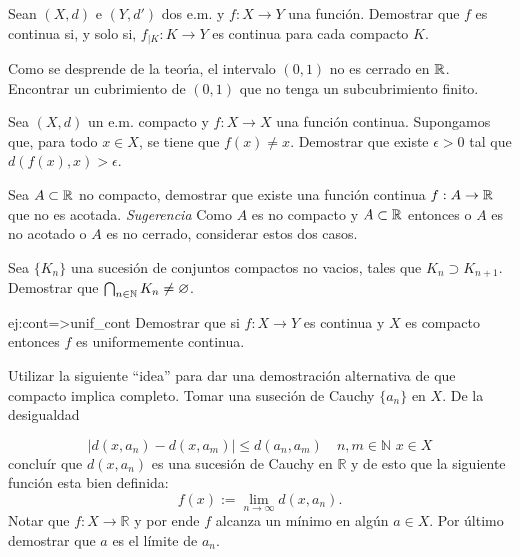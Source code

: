\begin{ejercicio}{} Sean $(X,d)$ e $(Y,d')$ dos e.m. y $f:X\to Y$
una funci\'on. Demostrar que $f$ es continua si, y solo si,
$f_{|K}:K\to Y$ es continua para cada compacto $K$.
\end{ejercicio}


\begin{ejercicio}{} Como se desprende de la teor\'{\i}a, el intervalo
$(0,1)$ no es cerrado en $\mathbb{R}$. Encontrar un cubrimiento de
$(0,1)$ que no tenga un subcubrimiento finito.
\end{ejercicio}

\begin{ejercicio}{} Sea $(X,d)$ un e.m. compacto y $f:X\to X$ una
funci\'on continua. Supongamos que, para todo $x\in X$, se tiene
que $f(x)\neq x$. Demostrar que existe $\epsilon>0$ tal que
$d(f(x),x)>\epsilon$.
\end{ejercicio}

\begin{ejercicio}{} Sea $A\subset\mathbb{R}$ no compacto, demostrar que
existe una funci\'on continua $f:A\to\mathbb{R}$ que no es acotada.
\emph{Sugerencia} Como $A$ es no compacto y $A\subset \mathbb{R}$
entonces o $A$ es no acotado o $A$ es no cerrado, considerar estos
dos casos.
\end{ejercicio}


\begin{ejercicio}{} Sea $\{K_n\}$ una sucesi\'on de conjuntos
compactos no vacios, tales que $K_n\supset K_{n+1}$. Demostrar que
$\bigcap_{n\in\mathbb{N}}K_n\neq\varnothing$.
\end{ejercicio}

\begin{ejercicio}{ej:cont=>unif_cont} Demostrar que si $f:X\to Y$ es continua y $X$ es compacto entonces $f$ es uniformemente continua.
\end{ejercicio}

 
 \begin{ejercicio}{} Utilizar la siguiente ``idea'' para dar una
 demostración alternativa de que compacto implica completo. Tomar
 una suseción de Cauchy $\{a_n\}$ en $X$. De la desigualdad

 \[
	|d(x,a_n)-d(x,a_m)|\leq d(a_n,a_m)\quad n,m\in\mathbb{N}\,\,
	x\in X
 \]
 concluír que $d(x,a_n)$ es una sucesión de Cauchy en
 $\mathbb{R}$ y de esto que la siguiente función esta bien
 definida:
\[
	f(x):=\lim\limits_{n\to\infty}d(x,a_n).
\]
Notar que $f:X\to\mathbb{R}$ y por ende $f$ alcanza un mínimo en
algún $a\in X$. Por último demostrar que $a$ es el límite de
$a_n$.
\end{ejercicio}


